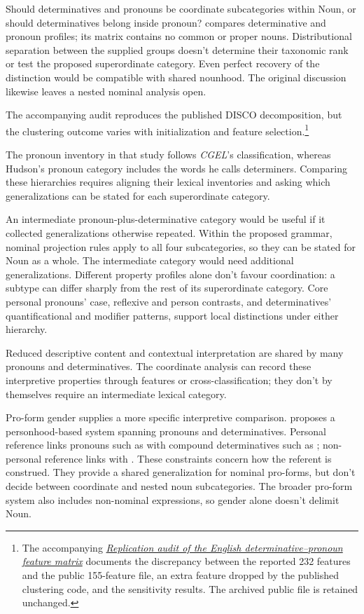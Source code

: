 \documentclass[12pt]{article}
\begin{document}
Should determinatives and pronouns be coordinate subcategories within Noun, or should determinatives belong inside pronoun? \textcite{reynolds2021} compares determinative and pronoun profiles; its matrix contains no common or proper nouns. Distributional separation between the supplied groups doesn't determine their taxonomic rank or test the proposed superordinate category. Even perfect recovery of the distinction would be compatible with shared nounhood. The original discussion likewise leaves a nested nominal analysis open.

The accompanying audit reproduces the published DISCO decomposition, but the clustering outcome varies with initialization and feature selection.\footnote{The accompanying \href{run:matrix-audit.pdf}{\textit{Replication audit of the English determinative--pronoun feature matrix}} documents the discrepancy between the reported 232 features and the public 155-feature file, an extra feature dropped by the published clustering code, and the sensitivity results. The archived public file is retained unchanged.}

The pronoun inventory in that study follows \textit{CGEL}'s classification, whereas Hudson's pronoun category includes the words he calls determiners. Comparing these hierarchies requires aligning their lexical inventories and asking which generalizations can be stated for each superordinate category.

An intermediate pronoun-plus-determinative category would be useful if it collected generalizations otherwise repeated. Within the proposed grammar, nominal projection rules apply to all four subcategories, so they can be stated for Noun as a whole. The intermediate category would need additional generalizations. Different property profiles alone don't favour coordination: a subtype can differ sharply from the rest of its superordinate category. Core personal pronouns' case, reflexive and person contrasts, and determinatives' quantificational and modifier patterns, support local distinctions under either hierarchy.

Reduced descriptive content and contextual interpretation are shared by many pronouns and determinatives. The coordinate analysis can record these interpretive properties through features or cross-classification; they don't by themselves require an intermediate lexical category.

Pro-form gender supplies a more specific interpretive comparison. \textcite{reynolds2025proformgender} proposes a personhood-based system spanning pronouns and determinatives. Personal reference links pronouns such as  with compound determinatives such as ; non-personal reference links  with . These constraints concern how the referent is construed. They provide a shared generalization for nominal pro-forms, but don't decide between coordinate and nested noun subcategories. The broader pro-form system also includes non-nominal expressions, so gender alone doesn't delimit Noun.
\end{document}
